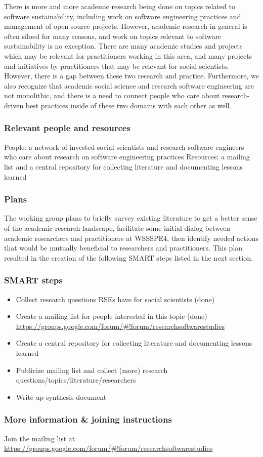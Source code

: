 There is more and more academic research being done on topics related to software sustainability, including work on software engineering practices and management of open source projects. However, academic research in general is often siloed for many reasons, and work on topics relevant to software sustainability is no exception. There are many academic studies and projects which may be relevant for practitioners working in this area, and many projects and initiatives by practitioners that may be relevant for social scientists. However, there is a gap between these two research and practice. Furthermore, we also recognize that academic social science and research software engineering are not monolithic, and there is a need to connect people who care about research-driven best practices inside of these two domains with each other as well.


\subsubsection{Relevant people and resources}

People: a network of invested social scientists and research software engineers who care about research on software engineering practices
Resources: a mailing list and a central repository for collecting literature and documenting lessons learned

\subsubsection{Plans}

The working group plans to briefly survey existing literature to get a better sense of the academic research landscape, facilitate some initial dialog between academic researchers and practitioners at WSSSPE4, then identify needed actions that would be mutually beneficial to researchers and practitioners. This plan resulted in the creation of the following SMART steps listed in the next section.

\subsubsection{SMART steps}

\begin{itemize}
\item Collect research questions RSEs have for social scientists (done)
\item Create a mailing list for people interested in this topic (done) \url{https://groups.google.com/forum/#!forum/researchsoftwarestudies}
\item Create a central repository for collecting literature and documenting lessons learned
\item Publicize mailing list and collect (more) research questions/topics/literature/researchers
\item Write up synthesis document 
\end{itemize}

\subsubsection{More information \& joining instructions}

Join the mailing list at \url{https://groups.google.com/forum/#!forum/researchsoftwarestudies}
